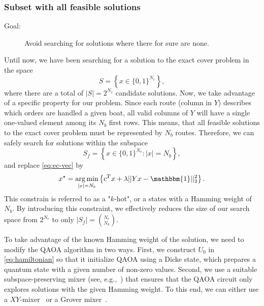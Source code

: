 \documentclass{article}
\begin{document}
\subsubsection{Subset with all feasible solutions}
\label{sec:ec-subset}
\begin{description}
    \item[Goal:] Avoid searching for solutions where there for sure are none. 
\end{description}
Until now, we have been searching for a solution to the exact cover problem in the space
\begin{equation}
    S = \left\{ x \in \{0,1\}^{N_r} \right\},
    \label{eq:total-solution-space}
\end{equation}
where there are a total of $|S| = 2^{N_r}$ candidate solutions.
Now, we take advantage of a specific property for our problem. Since each route (column in $Y$) describes which orders are handled a given boat, all valid columns of $Y$ will have a single one-valued element among its $N_b$ first rows. This means, that all feasible solutions to the exact cover problem must be represented by $N_b$ routes. Therefore, we can safely search for solutions within the subspace 
\begin{equation}
    S_f = \left\{x \in \{0,1\}^{N_r} : |x| = N_b\right\},
    \label{eq:feasible_space}
\end{equation}
and replace \eqref{eq:ec-vec} by
\begin{equation}
    x^\star = \operatorname*{arg\,min}_{ |x| = N_b} \left\{ c^T x + \lambda ||Y x - \mathbbm{1}||_2^2 \right\}.
    \label{eq:ec-subspace}
\end{equation}
This constrain is referred to as a "$k$-hot", or a states with a Hamming weight of $N_b$.  
By introducing this constraint, we effectively reduces the size of our search space from $2^{N_r}$ to only $|S_f| = \binom{N_r}{N_b}$.

To take advantage of the known Hamming weight of the solution, we need to modify the QAOA algorithm in two ways.
First, we construct $U_0$ in \eqref{eq:hamiltonian} so that it initialize QAOA using a Dicke state, which prepares a quantum state with a given number of non-zero values. 
Second, we use a suitable subspace-preserving mixer (see, e.g.,~\cite{Fuchs2022_cp-mixers, Fuchs2024lxmixersqaoa}) that ensures that the QAOA circuit only explores solutions with the given Hamming weight. To this end, we can either use a $XY$-mixer~\cite{hadfield2017_qaoaHardSoft, Wang2020-XYmixers} or a Grover mixer~\cite{Bartschi2020_groverMixer}.
\end{document}
